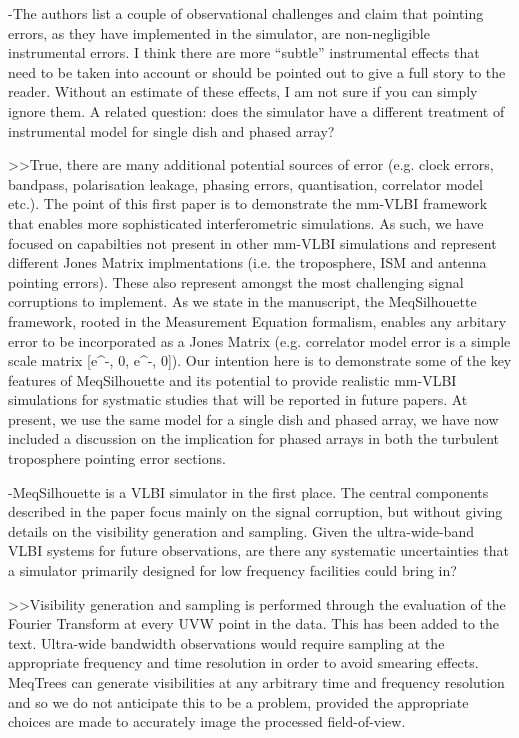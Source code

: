 -The authors list a couple of observational challenges and claim that pointing errors, as they have implemented in the simulator, are non-negligible instrumental errors. I think there are more “subtle” instrumental effects that need to be taken into account or should be pointed out to give a full story to the reader. Without an estimate of these effects, I am not sure if you can simply ignore them. A related question: does the simulator have a different treatment of instrumental model for single dish and phased array?


>>True, there are many additional potential sources of error (e.g. clock errors, bandpass, polarisation leakage, phasing errors, quantisation, correlator model etc.). The point of this first paper is to demonstrate the mm-VLBI framework that enables more sophisticated interferometric simulations. As such, we have focused on capabilties not present in other mm-VLBI simulations and represent different Jones Matrix implmentations (i.e. the troposphere, ISM and antenna pointing errors). These also represent amongst the most challenging signal corruptions to implement. As we state in the manuscript, the MeqSilhouette framework, rooted in the Measurement Equation formalism, enables any arbitary error to be incorporated as a Jones Matrix (e.g. correlator model error is a simple scale matrix [e^-\phi, 0, e^-\phi, 0]). Our intention here is to demonstrate some of the key features of MeqSilhouette and its potential to provide realistic mm-VLBI simulations for systmatic studies that will be reported in future papers. At present, we use the same model for a single dish and phased array, we have now included a discussion on the implication for phased arrays in both the turbulent troposphere pointing error sections.



-MeqSilhouette is a VLBI simulator in the first place. The central components described in the paper focus mainly on the signal corruption, but without giving details on the visibility generation and sampling. Given the ultra-wide-band VLBI systems for future observations, are there any systematic uncertainties that a simulator primarily designed for low frequency facilities could bring in?


>>Visibility generation and sampling is performed through the evaluation of the Fourier Transform at every UVW point in the data. This has been added to the text. Ultra-wide bandwidth observations would require sampling at the appropriate frequency and time resolution in order to avoid smearing effects. MeqTrees can generate visibilities at any arbitrary time and frequency resolution and so we do not anticipate this to be a problem, provided the appropriate choices are made to accurately image the processed field-of-view.

